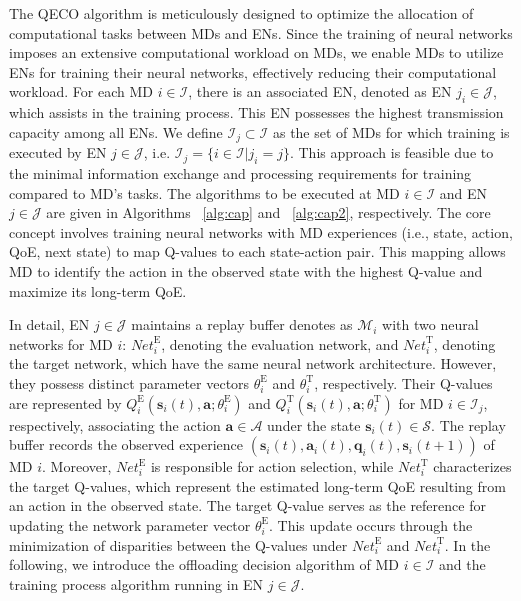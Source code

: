 \documentclass[10pt, journal,letterpaper]{IEEEtran}
\begin{document}
The QECO algorithm is meticulously designed to optimize the allocation of computational tasks between MDs and ENs. Since the training of neural networks imposes an extensive computational workload on MDs, we enable MDs to utilize ENs for training their neural networks, effectively reducing their computational workload. For each MD $i \in \mathcal{I}$, there is an associated EN, denoted as EN $j_i \in \mathcal{J}$, which assists in the training process. This EN possesses the highest transmission capacity among all ENs. We define $\mathcal{I}_j \subset \mathcal{I}$ as the set of MDs for which training is executed by EN $j \in \mathcal{J}$, i.e. $\mathcal{I}_j = \{i \in \mathcal{I} | j_i = j\}$. This approach is feasible due to the minimal information exchange and processing requirements for training compared to MD's tasks. The algorithms to be executed at MD $i \in \mathcal{I}$ and EN $j \in \mathcal{J}$ are given in Algorithms ~\ref{alg:cap} and ~\ref{alg:cap2}, respectively. The core concept involves training neural networks with MD experiences (i.e., state, action, QoE, next state) to map Q-values to each state-action pair. This mapping allows MD to identify the action in the observed state with the highest Q-value and maximize its long-term QoE.




In detail, EN $j \in \mathcal{J}$ maintains a replay buffer denotes as $\mathcal{M}_i$ with two neural networks for MD $i$: $\textit{Net}_i^{\text{E}}$, denoting the evaluation network, and $\textit{Net}_i^{\text{T}}$, denoting the target network, which have the same neural network architecture. However, they possess distinct parameter vectors $\theta^{\text{E}}_i$ and $\theta^{\text{T}}_i$, respectively. Their Q-values are represented by $Q_i^{\text{E}}(\boldsymbol{s}_i(t), \boldsymbol{a}; \theta^{\text{E}}_i)$ and $Q_i^{\text{T}}(\boldsymbol{s}_i(t), \boldsymbol{a}; \theta^{\text{T}}_i)$ for MD $i \in \mathcal{I}_j$, respectively, associating the action $\boldsymbol{a} \in \mathcal{A}$ under the state $\boldsymbol{s}_i(t) \in \mathcal{S}$. The replay buffer records the observed experience $(\boldsymbol{s}_i(t), \boldsymbol{a}_i(t), \boldsymbol{q}_i(t), \boldsymbol{s}_i(t+1))$ of MD $i$. Moreover, $\textit{Net}_i^{\text{E}}$ is responsible for action selection, while $\textit{Net}_i^{\text{T}}$ characterizes the target Q-values, which represent the estimated long-term QoE resulting from an action in the observed state. The target Q-value serves as the reference for updating the network parameter vector $\theta^{\text{E}}_i$. This update occurs through the minimization of disparities between the Q-values under $\textit{Net}_i^{\text{E}}$ and $\textit{Net}_i^{\text{T}}$. In the following, we introduce the offloading decision algorithm of MD $i \in \mathcal{I}$ and the training process algorithm running in EN $j \in \mathcal{J}$.
\end{document}
